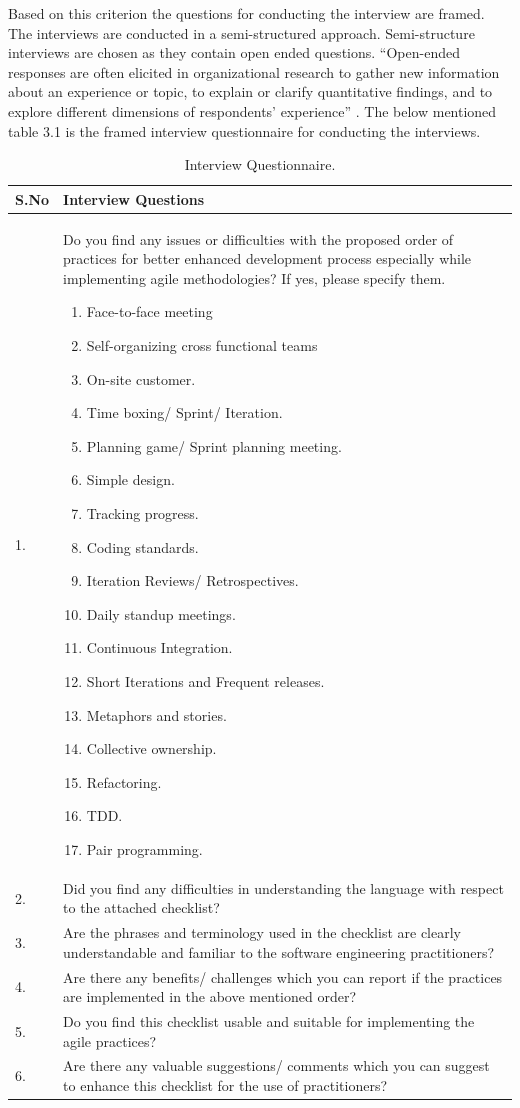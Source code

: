 \documentclass[a4paper,oneside]{bth}
\begin{document}
Based on this criterion the questions for conducting the interview are framed. The interviews are conducted in a semi-structured approach. Semi-structure interviews are chosen as they contain open ended questions. “Open-ended responses are often elicited in organizational research to gather new information about an experience or topic, to explain or clarify quantitative findings, and to explore different dimensions of respondents’ experience” \cite{jackson_concept_2002}. The below mentioned table 3.1 is the framed interview questionnaire for conducting the interviews.
\begin{longtable}[H]{|p{1cm}|p{13cm}|}
\caption{Interview Questionnaire. \label{interview questionnaire}}\\\hline
\textbf{S.No} & \textbf{Interview Questions}\\ \hline
1. & Do you find any issues or difficulties with the proposed order of practices for better enhanced development process especially while implementing agile methodologies? If yes, please specify them.\begin{enumerate}
\item Face-to-face meeting
\item Self-organizing cross functional teams
\item On-site customer.
\item	Time boxing/ Sprint/ Iteration.
\item Planning game/ Sprint planning meeting.
\item	Simple design.
\item	Tracking progress.
\item	Coding standards.
\item	Iteration Reviews/ Retrospectives.
\item	Daily standup meetings.
\item	Continuous Integration.
\item	Short Iterations and Frequent releases.
\item	Metaphors and stories.
\item	Collective ownership.
\item	Refactoring.
\item	TDD.
\item	Pair programming.
\end{enumerate}\\ \hline
2. & Did you find any difficulties in understanding the language with respect to the attached checklist?\\ \hline
3. & Are the phrases and terminology used in the checklist are clearly understandable and familiar to the software engineering practitioners?\\ \hline
4. & Are there any benefits/ challenges which you can report if the practices are implemented in the above mentioned order?\\ \hline
5. & Do you find this checklist usable and suitable for implementing the agile practices? \\ \hline
6. & Are there any valuable suggestions/ comments which you can suggest to enhance this checklist for the use of practitioners?\\ \hline
\end{longtable}
\end{document}
